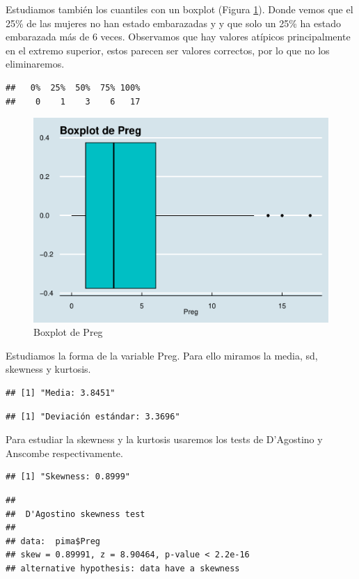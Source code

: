 \documentclass[
]{article}
\begin{document}
Estudiamos también los cuantiles con un boxplot (Figura
\ref{fig:box_preg}). Donde vemos que el 25\% de las mujeres no han
estado embarazadas y y que solo un 25\% ha estado embarazada más de 6
veces. Observamos que hay valores atípicos principalmente en el extremo
superior, estos parecen ser valores correctos, por lo que no los
eliminaremos.

\begin{verbatim}
##   0%  25%  50%  75% 100% 
##    0    1    3    6   17
\end{verbatim}

\begin{figure}

{\centering \includegraphics[width=0.5\linewidth]{pima-clasificacion_files/figure-latex/box_preg-1} 

}

\caption{Boxplot de Preg}\label{fig:box_preg}
\end{figure}

Estudiamos la forma de la variable Preg. Para ello miramos la media, sd,
skewness y kurtosis.

\begin{verbatim}
## [1] "Media: 3.8451"
\end{verbatim}

\begin{verbatim}
## [1] "Deviación estándar: 3.3696"
\end{verbatim}

Para estudiar la skewness y la kurtosis usaremos los tests de D'Agostino
y Anscombe respectivamente.

\begin{verbatim}
## [1] "Skewness: 0.8999"
\end{verbatim}

\begin{verbatim}
## 
##  D'Agostino skewness test
## 
## data:  pima$Preg
## skew = 0.89991, z = 8.90464, p-value < 2.2e-16
## alternative hypothesis: data have a skewness
\end{verbatim}
\end{document}
